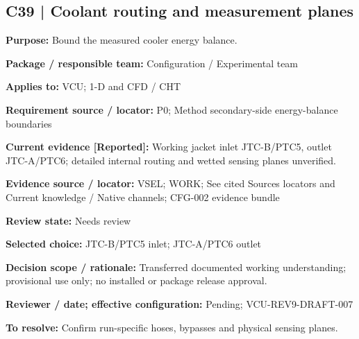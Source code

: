 \documentclass[11pt]{article}
\begin{document}
\par\noindent\begin{minipage}{\textwidth}\small\setlength{\parskip}{2pt}
\subsection*{C39 | Coolant routing and measurement planes}
\textbf{Purpose:} Bound the measured cooler energy balance.\par
\textbf{Package / responsible team:} Configuration / Experimental team\par
\textbf{Applies to:} VCU; 1-D and CFD / CHT\par
\textbf{Requirement source / locator:} P0; Method secondary-side energy-balance boundaries\par
\textbf{Current evidence [Reported]:} Working jacket inlet JTC-B/PTC5, outlet JTC-A/PTC6; detailed internal routing and wetted sensing planes unverified.\par
\textbf{Evidence source / locator:} VSEL; WORK; See cited Sources locators and Current knowledge / Native channels; CFG-002 evidence bundle\par
\textbf{Review state:} Needs review\par
\textbf{Selected choice:} JTC-B/PTC5 inlet; JTC-A/PTC6 outlet\par
\textbf{Decision scope / rationale:} Transferred documented working understanding; provisional use only; no installed or package release approval.\par
\textbf{Reviewer / date; effective configuration:} Pending; VCU-REV9-DRAFT-007\par
\textbf{To resolve:} Confirm run-specific hoses, bypasses and physical sensing planes.\par
\end{minipage}\par\vspace{5pt}
\end{document}

